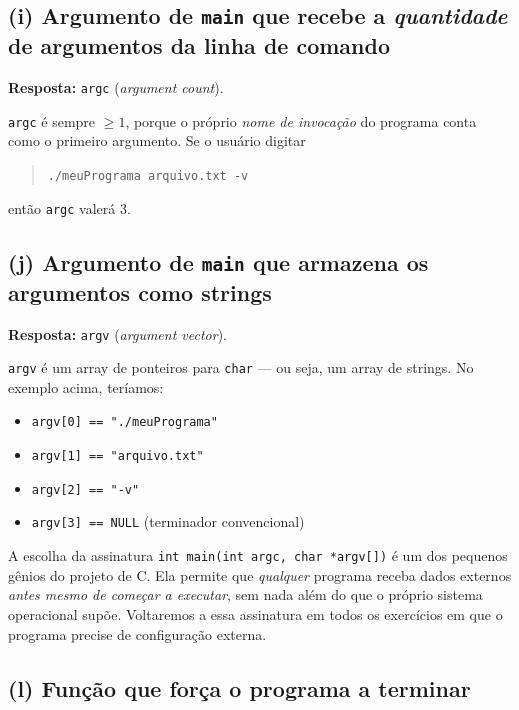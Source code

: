 \documentclass[11pt,a4paper]{article}
\begin{document}
\subsection*{(i) Argumento de \texttt{main} que recebe a \emph{quantidade} de argumentos da linha de comando}

\begin{resposta}\textbf{Resposta:} \texttt{argc} (\emph{argument count}).\end{resposta}

\texttt{argc} \'e sempre $\geq 1$, porque o pr\'oprio \emph{nome de invoca\c{c}\~ao} do programa conta como o primeiro argumento. Se o usu\'ario digitar
\begin{quote}\texttt{./meuPrograma arquivo.txt -v}\end{quote}
\noindent ent\~ao \texttt{argc} valer\'a 3.

\subsection*{(j) Argumento de \texttt{main} que armazena os argumentos como strings}

\begin{resposta}\textbf{Resposta:} \texttt{argv} (\emph{argument vector}).\end{resposta}

\texttt{argv} \'e um array de ponteiros para \texttt{char} --- ou seja, um array de strings. No exemplo acima, ter\'iamos:
\begin{itemize}[leftmargin=*, itemsep=0pt]
  \item \texttt{argv[0] == "./meuPrograma"}
  \item \texttt{argv[1] == "arquivo.txt"}
  \item \texttt{argv[2] == "-v"}
  \item \texttt{argv[3] == NULL} (terminador convencional)
\end{itemize}

\begin{obseng}
A escolha da assinatura \texttt{int main(int argc, char *argv[])} \'e um dos pequenos g\^enios do projeto de C. Ela permite que \emph{qualquer} programa receba dados externos \emph{antes mesmo de come\c{c}ar a executar}, sem nada al\'em do que o pr\'oprio sistema operacional sup\~oe. Voltaremos a essa assinatura em todos os exerc\'icios em que o programa precise de configura\c{c}\~ao externa.
\end{obseng}

\subsection*{(l) Fun\c{c}\~ao que for\c{c}a o programa a terminar}
\end{document}
